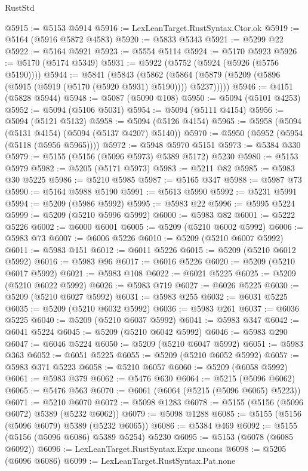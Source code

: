 \begin{lexlean}{RustStd}
\begin{coremodule}
@5915 := @5153 @5914
@5916 := LexLeanTarget.RustSyntax.Ctor.ok
@5919 := @5164 (@5916 @5872 @4583)
@5920 := @5833 @5343
@5921 := @5299 @22
@5922 := @5164 @5921
@5923 := @5554 @5114
@5924 := @5170 @5923
@5926 := @5170 (@5174 @5349)
@5931 := @5922 (@5752 (@5924 (@5926 (@5756 @5190))))
@5944 := @5841
    (@5843
      (@5862 (@5864 (@5879 (@5209 (@5896 (@5915 (@5919 (@5170 (@5920 @5931) @5190)))) @5237)))))
@5946 := @4151 (@5828 @5944)
@5948 := @5087 (@5090 @108)
@5950 := @5094 (@5101 @4253)
@5952 := @5094 (@5106 @5031)
@5954 := @5094 (@5111 @4154)
@5956 := @5094 (@5121 @5132)
@5958 := @5094 (@5126 @4154)
@5965 := @5958 (@5094 (@5131 @4154) (@5094 (@5137 @4207) @5140))
@5970 := @5950 (@5952 (@5954 (@5118 (@5956 @5965))))
@5972 := @5948 @5970 @5151
@5973 := @5384 @330
@5979 := @5155 (@5156 (@5096 @5973) @5389 @5172) @5230
@5980 := @5153 @5979
@5982 := @5205 (@5171 @5973)
@5983 := @5211 @82
@5985 := @5983 @30 @5225
@5986 := @5210 @5985
@5987 := @5165 @347
@5988 := @5987 @73
@5990 := @5164 @5988 @5190
@5991 := @5613 @5990
@5992 := @5231 @5991
@5994 := @5209 (@5986 @5992)
@5995 := @5983 @22
@5996 := @5995 @5224
@5999 := @5209 (@5210 @5996 @5992)
@6000 := @5983 @82
@6001 := @5222 @5226
@6002 := @6000 @6001
@6005 := @5209 (@5210 @6002 @5992)
@6006 := @5983 @73
@6007 := @6006 @5226
@6010 := @5209 (@5210 @6007 @5992)
@6011 := @5983 @151
@6012 := @6011 @5226
@6015 := @5209 (@5210 @6012 @5992)
@6016 := @5983 @96
@6017 := @6016 @5226
@6020 := @5209 (@5210 @6017 @5992)
@6021 := @5983 @108
@6022 := @6021 @5225
@6025 := @5209 (@5210 @6022 @5992)
@6026 := @5983 @719
@6027 := @6026 @5225
@6030 := @5209 (@5210 @6027 @5992)
@6031 := @5983 @255
@6032 := @6031 @5225
@6035 := @5209 (@5210 @6032 @5992)
@6036 := @5983 @261
@6037 := @6036 @5225
@6040 := @5209 (@5210 @6037 @5992)
@6041 := @5983 @347
@6042 := @6041 @5224
@6045 := @5209 (@5210 @6042 @5992)
@6046 := @5983 @290
@6047 := @6046 @5224
@6050 := @5209 (@5210 @6047 @5992)
@6051 := @5983 @363
@6052 := @6051 @5225
@6055 := @5209 (@5210 @6052 @5992)
@6057 := @5983 @371 @5223
@6058 := @5210 @6057
@6060 := @5209 (@6058 @5992)
@6061 := @5983 @379
@6062 := @5476 @630
@6064 := @5215 (@5096 @6062)
@6065 := @5476 @563
@6070 := @6061 (@6064 (@5215 (@5096 @6065) @5223))
@6071 := @5210 @6070
@6072 := @5098 @1283
@6078 := @5155 (@5156 (@5096 @6072) @5389 (@5232 @6062))
@6079 := @5098 @1288
@6085 := @5155 (@5156 (@5096 @6079) @5389 (@5232 @6065))
@6086 := @5384 @469
@6092 := @5155 (@5156 (@5096 @6086) @5389 @5254) @5230
@6095 := @5153 (@6078 (@6085 @6092))
@6096 := LexLeanTarget.RustSyntax.Expr.uncons
@6098 := @5205 (@6096 @6086)
@6099 := LexLeanTarget.RustSyntax.Pat.none

\end{coremodule}
\end{lexlean}
